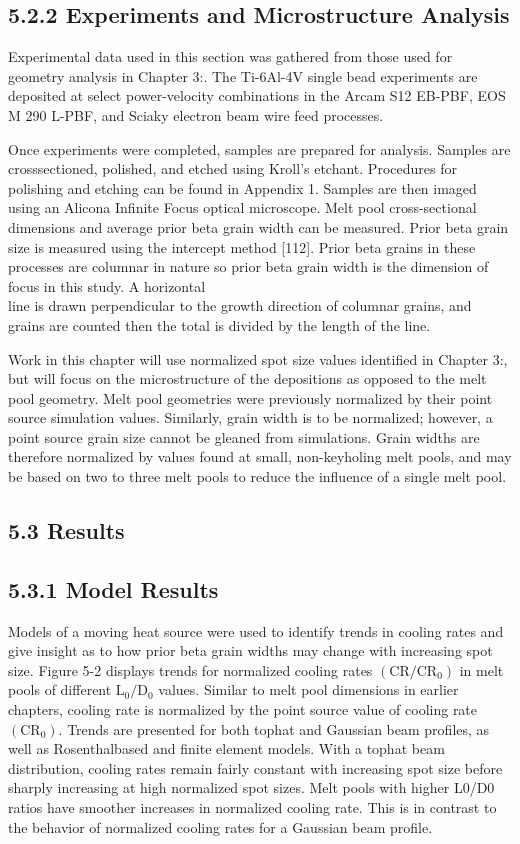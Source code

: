 \documentclass[10pt]{article}
\begin{document}
\subsection*{5.2.2 Experiments and Microstructure Analysis}
Experimental data used in this section was gathered from those used for geometry analysis in Chapter 3:. The Ti-6Al-4V single bead experiments are deposited at select power-velocity combinations in the Arcam S12 EB-PBF, EOS M 290 L-PBF, and Sciaky electron beam wire feed processes.

Once experiments were completed, samples are prepared for analysis. Samples are crosssectioned, polished, and etched using Kroll's etchant. Procedures for polishing and etching can be found in Appendix 1. Samples are then imaged using an Alicona Infinite Focus optical microscope. Melt pool cross-sectional dimensions and average prior beta grain width can be measured. Prior beta grain size is measured using the intercept method [112]. Prior beta grains in these processes are columnar in nature so prior beta grain width is the dimension of focus in this study. A horizontal\\
line is drawn perpendicular to the growth direction of columnar grains, and grains are counted then the total is divided by the length of the line.

Work in this chapter will use normalized spot size values identified in Chapter 3:, but will focus on the microstructure of the depositions as opposed to the melt pool geometry. Melt pool geometries were previously normalized by their point source simulation values. Similarly, grain width is to be normalized; however, a point source grain size cannot be gleaned from simulations. Grain widths are therefore normalized by values found at small, non-keyholing melt pools, and may be based on two to three melt pools to reduce the influence of a single melt pool.

\subsection*{5.3 Results}
\subsection*{5.3.1 Model Results}
Models of a moving heat source were used to identify trends in cooling rates and give insight as to how prior beta grain widths may change with increasing spot size. Figure 5-2 displays trends for normalized cooling rates $\left(\mathrm{CR} / \mathrm{CR}_{0}\right)$ in melt pools of different $\mathrm{L}_{0} / \mathrm{D}_{0}$ values. Similar to melt pool dimensions in earlier chapters, cooling rate is normalized by the point source value of cooling rate $\left(\mathrm{CR}_{0}\right)$. Trends are presented for both tophat and Gaussian beam profiles, as well as Rosenthalbased and finite element models. With a tophat beam distribution, cooling rates remain fairly constant with increasing spot size before sharply increasing at high normalized spot sizes. Melt pools with higher L0/D0 ratios have smoother increases in normalized cooling rate. This is in contrast to the behavior of normalized cooling rates for a Gaussian beam profile.
\end{document}
